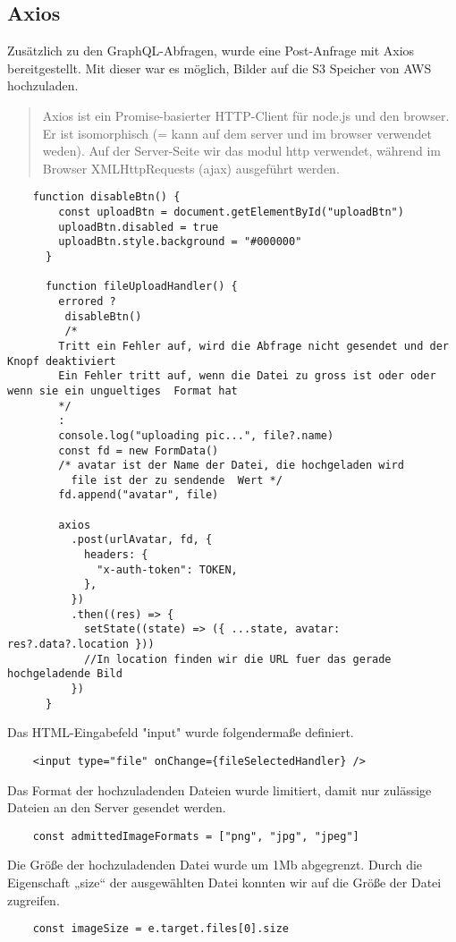 \newpage
\subsection{Axios}
Zusätzlich zu den GraphQL-Abfragen, wurde eine Post-Anfrage mit Axios bereitgestellt.
Mit dieser war es möglich, Bilder auf die S3 Speicher von AWS hochzuladen.

\begin{quote}
Axios ist ein Promise-basierter HTTP-Client für node.js und den browser. Er ist isomorphisch (= kann auf dem server und im browser verwendet weden). Auf der Server-Seite wir das modul http verwendet, während im Browser XMLHttpRequests (ajax) ausgeführt werden.
\end{quote}

\begin{lstlisting}
    function disableBtn() {
        const uploadBtn = document.getElementById("uploadBtn")
        uploadBtn.disabled = true
        uploadBtn.style.background = "#000000"
      }
    
      function fileUploadHandler() {
        errored ? 
         disableBtn()
         /*
        Tritt ein Fehler auf, wird die Abfrage nicht gesendet und der Knopf deaktiviert 
        Ein Fehler tritt auf, wenn die Datei zu gross ist oder oder wenn sie ein ungueltiges  Format hat
        */
        :
        console.log("uploading pic...", file?.name)
        const fd = new FormData()
        /* avatar ist der Name der Datei, die hochgeladen wird
          file ist der zu sendende  Wert */
        fd.append("avatar", file)  
    
        axios
          .post(urlAvatar, fd, {
            headers: {
              "x-auth-token": TOKEN,
            },
          })
          .then((res) => {
            setState((state) => ({ ...state, avatar: res?.data?.location }))    
            //In location finden wir die URL fuer das gerade hochgeladende Bild 
          })
      }\end{lstlisting}

Das HTML-Eingabefeld "input" wurde folgendermaße definiert.
\begin{lstlisting}
    <input type="file" onChange={fileSelectedHandler} />
\end{lstlisting}


Das Format der hochzuladenden Dateien wurde limitiert, damit nur zulässige Dateien an den Server gesendet werden.
\begin{lstlisting}
    const admittedImageFormats = ["png", "jpg", "jpeg"]
\end{lstlisting}

Die Größe der hochzuladenden Datei wurde um 1Mb abgegrenzt.
Durch die Eigenschaft „size“ der ausgewählten Datei konnten wir auf die Größe der Datei zugreifen.
\begin{lstlisting}
    const imageSize = e.target.files[0].size
\end{lstlisting}